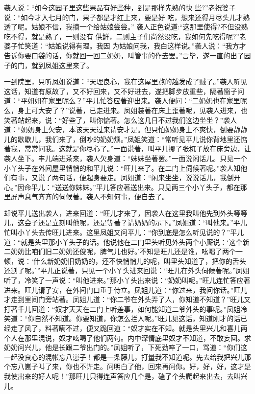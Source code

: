 \begin{parag}
    袭人说：“如今这园子里这些果品有好些种，到是那样先熟的快
    些?”老祝婆子说：“如今才入七月的门，果子都是才红上来，要是好
    吃，想来还得月尽头儿才熟透了呢。姑娘不信，我摘一个给姑娘尝尝。”
    袭人正色说道:“这那里使得?不但没熟吃不得，就是熟了，一则没有
    供鲜，二则主子们尚然没吃，我如何先吃得呢?”老婆子忙笑道：“姑娘说得有理。我因
    为姑娘问我，我白这样说。”袭人说：“我方才告诉你要口袋的话，你就回一回二奶奶，叫管事的作去罢。”言毕，遂一直的出了园子的门，就到凤姐这里来了。
\end{parag}


\begin{parag}
    一到院里，只听凤姐说道：“天理良心，我在这屋里熬的越发成了贼了。”袭人听见这话，知道有原故了，又不好回来，又不好进去，遂把脚步放重些，隔著窗子问道：“平姐姐在家里呢么？”平儿忙答应著迎出来。袭人便问：“二奶奶也在家里呢么，身上可大安了？”说著，已走进来。凤姐装著在床上歪著呢，见袭人进来，也笑著站起来，说：“好些了，叫你惦著。怎么这几日不过我们这边坐坐？”袭人道：“奶奶身上欠安，本该天天过来请安才是。但只怕奶奶身上不爽快，倒要静静儿的歇歇儿，我们来了，倒吵的奶奶烦。”凤姐笑道：“常听见平儿说你背地里还惦著我，常常问我。这就是你尽心了。”一面说著，叫平儿挪了张杌子放在床旁边，让袭人坐下。丰儿端进茶来，袭人欠身道：“妹妹坐著罢。”一面说闲话儿。只见一个小丫头子在外间屋里悄悄的和平儿说：“旺儿来了。在二门上伺候著呢。”袭人知他们有事，又说了两句话，便起身要走。凤姐道：“闲来坐坐，说说话儿，我倒开心。”因命平儿：“送送你妹妹。”平儿答应著送出来。只见两三个小丫头子，都在那里屏声息气齐齐的伺候著。袭人不知何事，便自去了。
\end{parag}


\begin{parag}
    却说平儿送出袭人，进来回道：“旺儿才来了，因袭人在这里我叫他先到外头等等儿，这会子还是立刻叫他呢，还是等著？请奶奶的示下。”凤姐道：“叫他来。”平儿忙叫小丫头去传旺儿进来。这里凤姐又问平儿：“你到底是怎么听见说的？”平儿道：“就是头里那小丫头子的话。他说他在二门里头听见外头两个小厮说：‘这个新二奶奶比咱们旧二奶奶还俊呢，脾气儿也好。’不知是旺儿还是谁，吆喝了两个一顿，说：‘什么新奶奶旧奶奶的，还不快悄悄儿的呢，叫里头知道了，把你的舌头还割了呢。’”平儿正说著，只见一个小丫头进来回说：“旺儿在外头伺候著呢。”凤姐听了，冷笑了一声说：“叫他进来。”那小丫头出来说：“奶奶叫呢。”旺儿连忙答应著进来。旺儿请了安，在外间门口垂手侍立。凤姐儿道：“你过来，我问你话。”旺儿才走到里间门旁站著。凤姐儿道：“你二爷在外头弄了人，你知道不知道？”旺儿又打著千儿回道：“奴才天天在二门上听差事，如何能知道二爷外头的事呢。”凤姐冷笑道：“你自然不知道。你要知道，你怎么拦人呢。”旺儿见这话，知道刚才的话已经走了风了，料著瞒不过，便又跪回道：“奴才实在不知。就是头里兴儿和喜儿两个人在那里混说，奴才吆喝了他们两句。内中深情底里奴才不知道，不敢妄回。求奶奶问兴儿，他是长跟二爷出门的。”凤姐听了，下死劲啐了一口，骂道：“你们这一起没良心的混帐忘八崽子！都是一条藤儿，打量我不知道呢。先去给我把兴儿那个忘八崽子叫了来，你也不许走。问明白了他，回来再问你。好，好，好，这才是我使出来的好人呢！”那旺儿只得连声答应几个是，磕了个头爬起来出去，去叫兴儿。
\end{parag}


